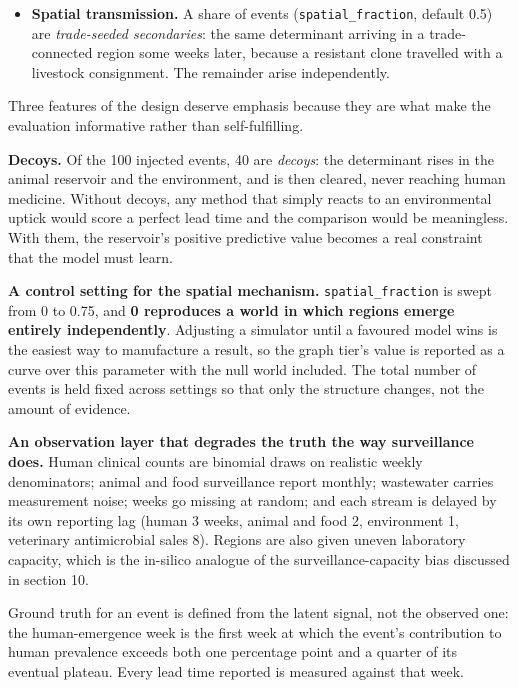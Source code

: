 \documentclass[11pt,a4paper]{article}
\begin{document}
\begin{itemize}[leftmargin=1.3em,itemsep=2pt]
  \item \textbf{Spatial transmission.} A share of events (\texttt{spatial\_fraction}, default 0.5) are \emph{trade-seeded secondaries}: the same determinant arriving in a trade-connected region some weeks later, because a resistant clone travelled with a livestock consignment. The remainder arise independently.
\end{itemize}

Three features of the design deserve emphasis because they are what make the evaluation informative rather than self-fulfilling.

\textbf{Decoys.} Of the 100 injected events, 40 are \emph{decoys}: the determinant rises in the animal reservoir and the environment, and is then cleared, never reaching human medicine. Without decoys, any method that simply reacts to an environmental uptick would score a perfect lead time and the comparison would be meaningless. With them, the reservoir's positive predictive value becomes a real constraint that the model must learn.

\textbf{A control setting for the spatial mechanism.} \texttt{spatial\_fraction} is swept from 0 to 0.75, and \textbf{0 reproduces a world in which regions emerge entirely independently}. Adjusting a simulator until a favoured model wins is the easiest way to manufacture a result, so the graph tier's value is reported as a curve over this parameter with the null world included. The total number of events is held fixed across settings so that only the structure changes, not the amount of evidence.

\textbf{An observation layer that degrades the truth the way surveillance does.} Human clinical counts are binomial draws on realistic weekly denominators; animal and food surveillance report monthly; wastewater carries measurement noise; weeks go missing at random; and each stream is delayed by its own reporting lag (human 3 weeks, animal and food 2, environment 1, veterinary antimicrobial sales 8). Regions are also given uneven laboratory capacity, which is the in-silico analogue of the surveillance-capacity bias discussed in section 10.

Ground truth for an event is defined from the latent signal, not the observed one: the human-emergence week is the first week at which the event's contribution to human prevalence exceeds both one percentage point and a quarter of its eventual plateau. Every lead time reported is measured against that week.
\end{document}

